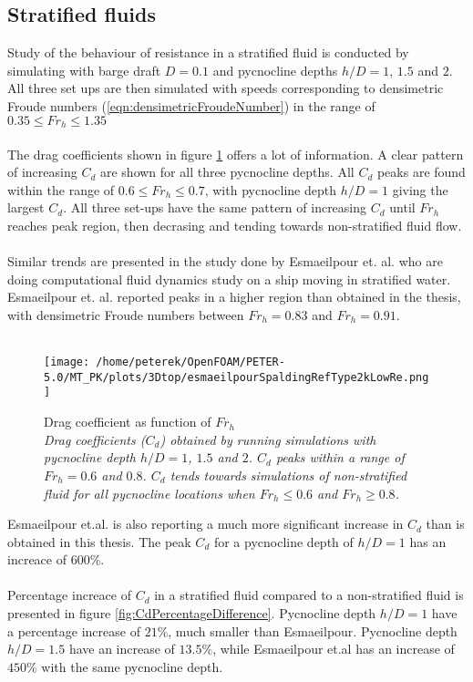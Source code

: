 \documentclass[a4paper, 12pt]{report}
\begin{document}
\subsection{Stratified fluids}
Study of the behaviour of resistance in a stratified fluid is conducted by simulating with barge draft $D=0.1$ and pycnocline depths $h/D=1$, $1.5$ and $2$. All three set ups are then simulated with speeds corresponding to densimetric Froude numbers (\ref{eqn:densimetricFroudeNumber}) in the range of $0.35\leq Fr_h \leq 1.35$\\
\\
The drag coefficients shown in figure \ref{fig:Cd} offers a lot of information. A clear pattern of increasing $C_d$ are shown for all three pycnocline depths. All $C_d$ peaks are found within the range of $0.6 \leq Fr_h \leq 0.7$, with pycnocline depth $h/D=1$ giving the largest $C_d$. All three set-ups have the same pattern of increasing $C_d$ until $Fr_h$ reaches peak region, then decrasing and tending towards non-stratified fluid flow.\\
\\
Similar trends are presented in the study done by Esmaeilpour et. al. \cite{Esmaeilpour} who are doing computational fluid dynamics study on a ship moving in stratified water.  Esmaeilpour et. al. reported peaks in a higher region than obtained in the thesis, with densimetric Froude numbers between $Fr_h=0.83$ and $Fr_h=0.91$.\\
\\
\begin{figure}[H]
	\centering
	\texttt{[image: /home/peterek/OpenFOAM/PETER-5.0/MT\_PK/plots/3Dtop/esmaeilpourSpaldingRefType2kLowRe.png]}
	\caption{Drag coefficient as function of $Fr_h$  \\ \textit{Drag coefficients ($C_d$) obtained by running simulations with pycnocline depth $h/D=1$, $1.5$ and $2$. $C_d$ peaks within a range of $Fr_h = 0.6$ and $0.8$. $C_d$ tends towards simulations of non-stratified fluid for all pycnocline locations when $Fr_h \leq 0.6$ and $Fr_h \geq 0.8$.}}
	\label{fig:Cd}
\end{figure}
Esmaeilpour et.al. is also reporting a much more significant increase in $C_d$ than is obtained in this thesis. The peak $C_d$ for a pycnocline depth of $h/D=1$ has an increace of $600\%$.\\
\\
Percentage increace of $C_d$ in a stratified fluid compared to a non-stratified fluid is presented in figure \ref{fig:CdPercentageDifference}. Pycnocline depth $h/D=1$ have a percentage increase of $21\%$, much smaller than Esmaeilpour. Pycnocline depth $h/D=1.5$ have an increase of $13.5\%$, while Esmaeilpour et.al has an increase of $450\%$ with the same pycnocline depth.\\
\end{document}
